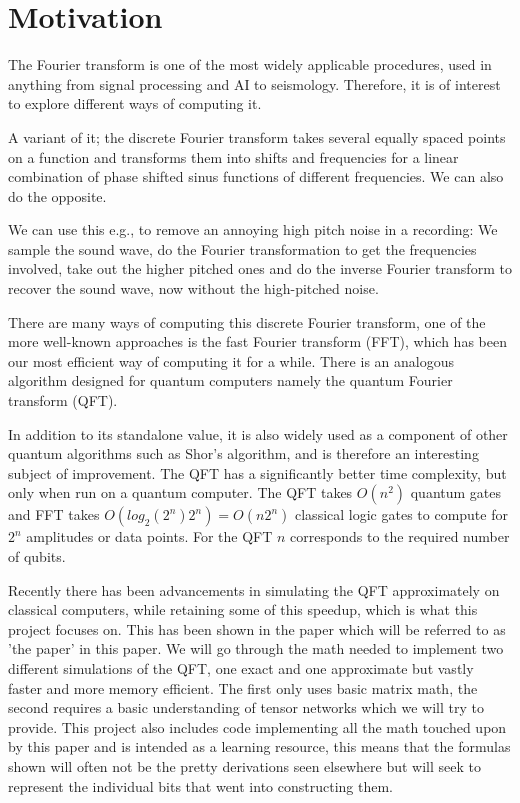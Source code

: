 \section{Motivation}
The Fourier transform is one of the most widely applicable procedures, used in anything from signal processing and AI to seismology. Therefore, it is of interest to explore different ways of computing it. 

\vspace{\baselineskip}
\noindent
A variant of it; the discrete Fourier transform takes several equally spaced points on a function 
and transforms them into shifts and frequencies for a linear combination of phase shifted sinus functions of different frequencies. 
We can also do the opposite. 

We can use this e.g., to remove an annoying high pitch noise in a recording: 
We sample the sound wave, do the Fourier transformation to get the frequencies involved, 
take out the higher pitched ones and do the inverse Fourier transform to recover the sound wave, now without the high-pitched noise. 



\vspace{\baselineskip}
\noindent
There are many ways of computing this discrete Fourier transform,
one of the more well-known approaches is the fast Fourier transform (FFT), which has been our most efficient way of computing it for a while. 
There is an analogous algorithm designed for quantum computers namely the quantum Fourier transform (QFT). 



In addition to its standalone value, it is also widely used as a component of other quantum algorithms such as Shor's algorithm, and is therefore an interesting subject of improvement. 
The QFT has a significantly better time complexity, but only when run on a quantum computer. The QFT takes $O(n^2)$ quantum gates and FFT takes $O(log_{2}(2^n) 2^n) = O(n2^n)$\cite{FFT_logic_gates} classical logic gates to compute for $2^n$ amplitudes or data points. For the QFT $n$ corresponds to the required number of qubits. 

Recently there has been advancements in simulating the QFT approximately on classical computers, while retaining some of this speedup, which is what this project focuses on. This has been shown in the paper\cite{the_paper} which will be referred to as 'the paper' in this paper. We will go through the math needed to implement two different simulations of the QFT, one exact and one approximate but vastly faster and more memory efficient. The first only uses basic matrix math, the second requires a basic understanding of tensor networks which we will try to provide. This project also includes code implementing all the math touched upon by this paper and is intended as a learning resource, this means that the formulas shown will often not be the pretty derivations seen elsewhere but will seek to represent the individual bits that went into constructing them. 



